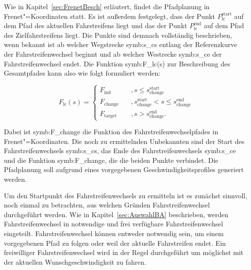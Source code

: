 Wie in Kapitel~\ref{sec:FrenetBesch} erl\"autert, findet die Pfadplanung in Frenet"=Koordinaten statt.
Es ist au{\ss}erdem festgelegt, dass der Punkt \( P_\mathrm{lc}^\mathrm{start}\) auf dem Pfad des aktuellen Fahrstreifens liegt und das der Punkt \( P_\mathrm{lc}^\mathrm{end}\) auf dem Pfad des Zielfahrstreifens liegt.
Die Punkte sind demnach vollst\"andig beschrieben, wenn bekannt ist ab welcher Wegstrecke \gls{symb:s_cs} entlang der Referenzkurve der Fahrstreifenwechsel beginnt und ab welcher Westrecke \gls{symb:s_ce} der Fahrstreifenwechsel endet.
Die Funktion \gls{symb:F_lc}(s) zur Beschreibung des Gesamtpfades kann also wie folgt formuliert werden:

\begin{equation}
  F_\mathrm{lc}(s) = 
  \begin{cases} 
    F_\mathrm{init}                         & \quad , s \leq s_\mathrm{change}^\mathrm{start}\\ 
    F_\mathrm{change}                  & \quad , s_\mathrm{change}^\mathrm{start} < s \leq s_\mathrm{change}^\mathrm{end}\\ 
    F_\mathrm{target}                     & \quad , s > s_\mathrm{change}^\mathrm{end}.
  \end{cases} 
  \label{eqn:Kostenfunktion}
\end{equation}

Dabei ist \gls{symb:F_change} die Funktion des Fahrstreifenwechselpfades in Frenet"=Koordinaten.
Die noch zu ermittelnden Unbekannten sind der Start des Fahrstreifenwechsels \gls{symb:s_cs}, das Ende des Fahrstreifenwechsels \gls{symb:s_ce} und die Funktion \gls{symb:F_change}, die die beiden Punkte verbindet.
Die Pfadplanung soll aufgrund eines vorgegebenen Geschwindigkeitsprofiles generiert werden.

Um den Startpunkt des Fahrstreifenwechsels zu ermitteln ist es zun\"achst sinnvoll, noch einmal zu betrachten, aus welchen Gr\"unden Fahrstreifenwechsel durchgef\"uhrt werden.
Wie in Kapitel~\ref{sec:AuswahlBA} beschrieben, werden Fahrstreifenwechsel in notwendige und frei verf\"ugbare Fahrstreifenwechsel eingeteilt.
Fahrstreifenwechsel k\"onnen entweder notwendig sein, um einem vorgegebenen Pfad zu folgen oder weil der aktuelle Fahrstreifen endet.
Ein freiwilliger Fahrstreifenwechsel wird in der Regel durchgef\"uhrt um m\"oglichst mit der aktuellen Wunschgeschwindigkeit zu fahren.

